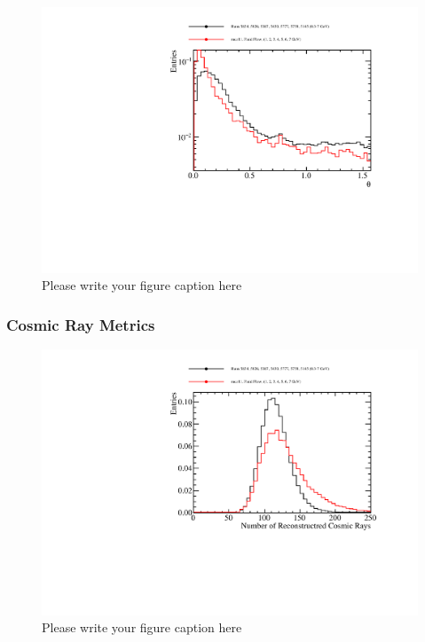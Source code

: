 \begin{figure}
\includegraphics[width=1.0\textwidth]{Figures/Metrics/Data/Beam/BeamParticleOpeningAngle.pdf}
\caption{Please write your figure caption here}
\label{fig:6}
\end{figure}

\subsubsection{Cosmic Ray Metrics}

\begin{figure}
\includegraphics[width=1.0\textwidth]{Figures/Metrics/Data/Cosmics/NumberofReconstructedCosmicRays.pdf}
\caption{Please write your figure caption here}
\label{fig:7}
\end{figure}

